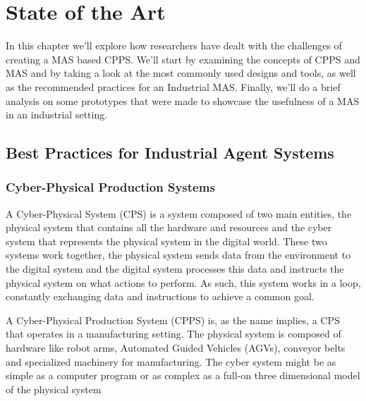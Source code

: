 

\chapter{State of the Art}
\label{cha:state-of-the-art}

In this chapter we'll explore how researchers have dealt with the challenges of creating a MAS based CPPS. We'll start by  examining the concepts of CPPS and MAS and by taking a look at the most commonly used designs and tools, as well as the recommended practices for an Industrial MAS. Finally, we'll do a brief analysis on some prototypes that were made to showcase the usefulness of a MAS in an industrial setting.

\section{Best Practices for Industrial Agent Systems}
\label{sec:best_practices}
\subsection{Cyber-Physical Production Systems}

A Cyber-Physical System (CPS) is a system composed of two main entities, the physical system that contains all the hardware and resources and the cyber system that represents the physical system in the digital world. These two systems work together, the physical system sends data from the environment to the digital system and the digital system processes this data and instructs the physical system on what actions to perform. As such, this system works in a loop, constantly exchanging data and instructions to achieve a common goal.

A Cyber-Physical Production System (CPPS) is, as the name implies, a CPS that operates in a manufacturing setting. The physical system is composed of hardware like robot arms, Automated Guided Vehicles (AGVs), conveyor belts and specialized machinery for manufacturing. The cyber system might be as simple as a computer program or as complex as a full-on three dimensional model of the physical system

